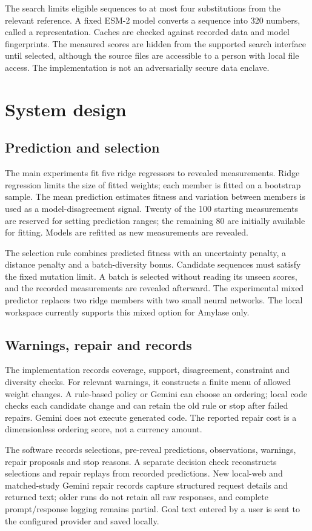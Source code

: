 \documentclass[11pt,a4paper]{article}
\begin{document}
The search limits eligible sequences to at most four substitutions from the relevant reference. A fixed ESM-2 model converts a sequence into 320 numbers, called a representation. Caches are checked against recorded data and model fingerprints. The measured scores are hidden from the supported search interface until selected, although the source files are accessible to a person with local file access. The implementation is not an adversarially secure data enclave.

\section{System design}
\subsection{Prediction and selection}
The main experiments fit five ridge regressors to revealed measurements. Ridge regression limits the size of fitted weights; each member is fitted on a bootstrap sample. The mean prediction estimates fitness and variation between members is used as a model-disagreement signal. Twenty of the 100 starting measurements are reserved for setting prediction ranges; the remaining 80 are initially available for fitting. Models are refitted as new measurements are revealed.

The selection rule combines predicted fitness with an uncertainty penalty, a distance penalty and a batch-diversity bonus. Candidate sequences must satisfy the fixed mutation limit. A batch is selected without reading its unseen scores, and the recorded measurements are revealed afterward. The experimental mixed predictor replaces two ridge members with two small neural networks. The local workspace currently supports this mixed option for Amylase only.

\subsection{Warnings, repair and records}
The implementation records coverage, support, disagreement, constraint and diversity checks. For relevant warnings, it constructs a finite menu of allowed weight changes. A rule-based policy or Gemini can choose an ordering; local code checks each candidate change and can retain the old rule or stop after failed repairs. Gemini does not execute generated code. The reported repair cost is a dimensionless ordering score, not a currency amount.

The software records selections, pre-reveal predictions, observations, warnings, repair proposals and stop reasons. A separate decision check reconstructs selections and repair replays from recorded predictions. New local-web and matched-study Gemini repair records capture structured request details and returned text; older runs do not retain all raw responses, and complete prompt/response logging remains partial. Goal text entered by a user is sent to the configured provider and saved locally.
\end{document}
